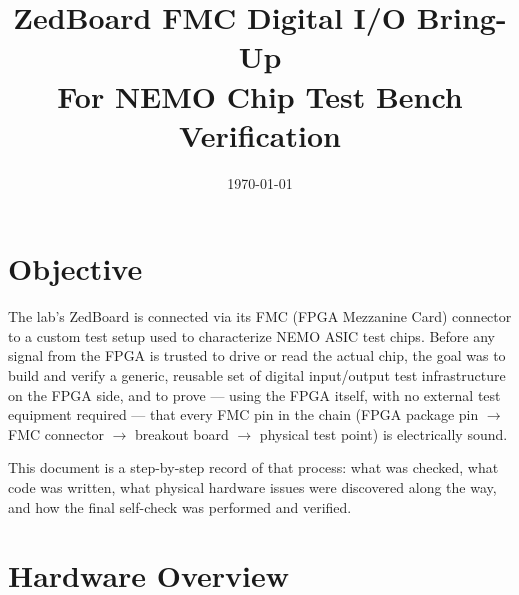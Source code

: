 \documentclass[11pt]{article}
\title{ZedBoard FMC Digital I/O Bring-Up \\ \large For NEMO Chip Test Bench Verification}
\author{}
\date{\today}
\begin{document}
\maketitle

\section{Objective}

The lab's ZedBoard is connected via its FMC (FPGA Mezzanine Card) connector to a custom
test setup used to characterize NEMO ASIC test chips. Before any signal from the FPGA is
trusted to drive or read the actual chip, the goal was to build and verify a generic,
reusable set of digital input/output test infrastructure on the FPGA side, and to prove
--- using the FPGA itself, with no external test equipment required --- that every FMC pin
in the chain (FPGA package pin $\rightarrow$ FMC connector $\rightarrow$ breakout board
$\rightarrow$ physical test point) is electrically sound.

This document is a step-by-step record of that process: what was checked, what code was
written, what physical hardware issues were discovered along the way, and how the final
self-check was performed and verified.

\section{Hardware Overview}
\end{document}
